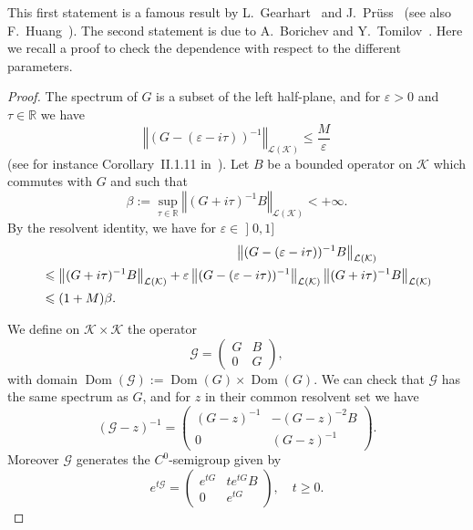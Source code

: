 \documentclass[10pt]{amsart}
\theoremstyle{definition}\newtheorem{defi}[theo]{Definition}\newtheorem{rema}[theo]{Remark}\newtheorem{exam}[theo]{Example}\newtheorem{exem}[theo]{Example}\newtheorem{nota}[theo]{Notation}
\newcommand{\nr}[1]{\left\Vert #1\right\Vert}
\renewcommand{\leq}{\leqslant}
\renewcommand{\geq}{\geqslant}
\newcommand{\inv}{^{-1}}
\newcommand{\1}{\mathds 1}
\DeclareMathOperator{\Dom}{Dom}
\newcommand{\R}{\mathbb{R}}
\renewcommand{\b}{\beta}
\newcommand{\e}{\varepsilon}
\renewcommand{\t}{\tau}
\newcommand{\Gc}{{\mathcal G}}
\newcommand{\Kc}{{\mathcal K}}
\newcommand{\Lc}{{\mathcal L}}
\newcommand{\stepp}{\noindent {\bf $\bullet$}\quad }
\begin{document}
This first statement is a famous result by L.~Gearhart~\cite{Gearhart78} and J.~Pr\"uss~\cite{Pruss84} (see also F.~Huang~\cite{Huang85}). The second statement is due to A.~Borichev and Y.~Tomilov~\cite{BorichevTo10}. Here we recall a proof to check the dependence with respect to the different parameters.

\begin{proof}
The spectrum of $G$ is a subset of the left half-plane, and for $\e > 0$ and $\t \in \R$ we have
\begin{equation}\label{estim-res-G}
\nr{(G-(\e-i\t))\inv}_{\Lc(\Kc)} \leq \frac M \e
\end{equation}
(see for instance Corollary~II.1.11 in~\cite{engel}). Let $B$ be a bounded operator on $\Kc$ which commutes with $G$ and such that
\[
\b := \sup_{\t \in \R} \nr{(G+i\t)^{-1} B}_{\Lc(\Kc)} < +\infty.
\]
By the resolvent identity, we have for $\e \in\mathopen{]}0,1]$
\begin{multline}\label{estim-resG-B}
\lefteqn{\nr{(G-(\e-i\t))\inv B}_{\Lc(\Kc)}}\\
\begin{aligned}
& \leq \nr{(G+i\t)\inv B}_{\Lc(\Kc)} + \e \nr{(G-(\e-i\t))\inv}_{\Lc(\Kc)}\nr{(G+i\t)\inv B}_{\Lc(\Kc)}\\
& \leq (1+M)\b.
\end{aligned}
\end{multline}

We define on $\Kc \times \Kc$ the operator
\[
\Gc =
\begin{pmatrix}
G & B \\
0 & G
\end{pmatrix},
\]
with domain $\Dom(\Gc) := \Dom(G) \times \Dom(G)$. We can check that $\Gc$ has the same spectrum as $G$, and for $z$ in their common resolvent set we have
\[
(\Gc - z)\inv =
\begin{pmatrix}
(G-z)\inv & -(G-z)^{-2} B \\
0 & (G-z)\inv
\end{pmatrix}.
\]
Moreover $\Gc$ generates the $C^0$-semigroup given by
\[
e^{t\Gc} =
\begin{pmatrix}
e^{tG} & t e^{tG} B \\
0 & e^{tG}
\end{pmatrix}, \quad t \geq 0.
\]


\end{proof}
\end{document}
